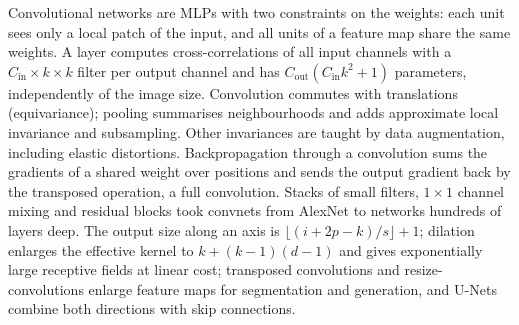 \documentclass[11pt]{article}
\newcommand{\Cin}{C_{\mathrm{in}}}
\newcommand{\Cout}{C_{\mathrm{out}}}
\begin{document}
\begin{keyidea}[Summary]
Convolutional networks are MLPs with two constraints on the weights: each unit sees only a local patch of the input, and
all units of a feature map share the same weights. A layer computes cross-correlations of all input channels with a
$\Cin \times k \times k$ filter per output channel and has $\Cout(\Cin k^2 + 1)$ parameters, independently of the image
size. Convolution commutes with translations (equivariance); pooling summarises neighbourhoods and adds approximate local
invariance and subsampling. Other invariances are taught by data augmentation, including elastic distortions.
Backpropagation through a convolution sums the gradients of a shared weight over positions and sends the output gradient
back by the transposed operation, a full convolution. Stacks of small filters, $1 \times 1$ channel mixing and residual
blocks took convnets from AlexNet to networks hundreds of layers deep. The output size along an axis is
$\lfloor (i + 2p - k)/s \rfloor + 1$; dilation enlarges the effective kernel to $k + (k - 1)(d - 1)$ and gives
exponentially large receptive fields at linear cost; transposed convolutions and resize-convolutions enlarge feature maps
for segmentation and generation, and U-Nets combine both directions with skip connections.
\end{keyidea}
\end{document}
